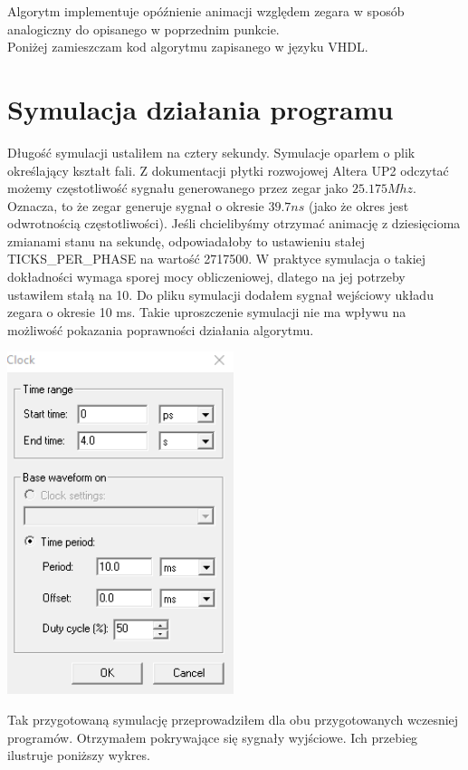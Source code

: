 \documentclass{article}
\begin{document}
        Algorytm implementuje opóźnienie animacji względem zegara w sposób analogiczny do opisanego w poprzednim punkcie.\\ 
        
        Poniżej zamieszczam kod algorytmu zapisanego w języku VHDL. 
        
    
    \section{Symulacja działania programu}
        Długość symulacji ustaliłem na cztery sekundy. Symulacje oparłem o plik określający kształt fali. Z dokumentacji płytki rozwojowej Altera UP2 odczytać możemy częstotliwość sygnału generowanego przez zegar jako $25.175Mhz$. Oznacza, to że zegar generuje sygnał o okresie $39.7ns$ (jako że okres jest odwrotnością częstotliwości). Jeśli chcielibyśmy otrzymać animację z dziesięcioma zmianami stanu na sekundę, odpowiadałoby to ustawieniu stałej TICKS\_PER\_PHASE na wartość 2717500. W praktyce symulacja o takiej dokładności wymaga sporej mocy obliczeniowej, dlatego na jej potrzeby ustawiłem stałą na 10. Do pliku symulacji dodałem sygnał wejściowy układu zegara o okresie 10 ms. Takie uproszczenie symulacji nie ma wpływu na możliwość pokazania poprawności działania algorytmu. 
        \begin{center}
            \includegraphics[height=10cm]{reports/img/fpga_clock.png}\\
        \end{center}
        \FloatBarrier
        Tak przygotowaną symulację przeprowadziłem dla obu przygotowanych wczesniej programów. Otrzymałem pokrywające się sygnały wyjściowe. Ich przebieg ilustruje poniższy wykres.
\end{document}
